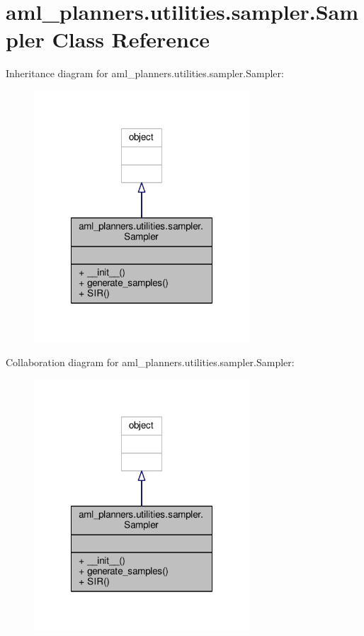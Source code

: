 \hypertarget{classaml__planners_1_1utilities_1_1sampler_1_1_sampler}{\section{aml\-\_\-planners.\-utilities.\-sampler.\-Sampler Class Reference}
\label{classaml__planners_1_1utilities_1_1sampler_1_1_sampler}
}


Inheritance diagram for aml\-\_\-planners.\-utilities.\-sampler.\-Sampler\-:
\nopagebreak
\begin{figure}[H]
\begin{center}
\leavevmode
\includegraphics[width=228pt]{classaml__planners_1_1utilities_1_1sampler_1_1_sampler__inherit__graph}
\end{center}
\end{figure}


Collaboration diagram for aml\-\_\-planners.\-utilities.\-sampler.\-Sampler\-:
\nopagebreak
\begin{figure}[H]
\begin{center}
\leavevmode
\includegraphics[width=228pt]{classaml__planners_1_1utilities_1_1sampler_1_1_sampler__coll__graph}
\end{center}
\end{figure}
